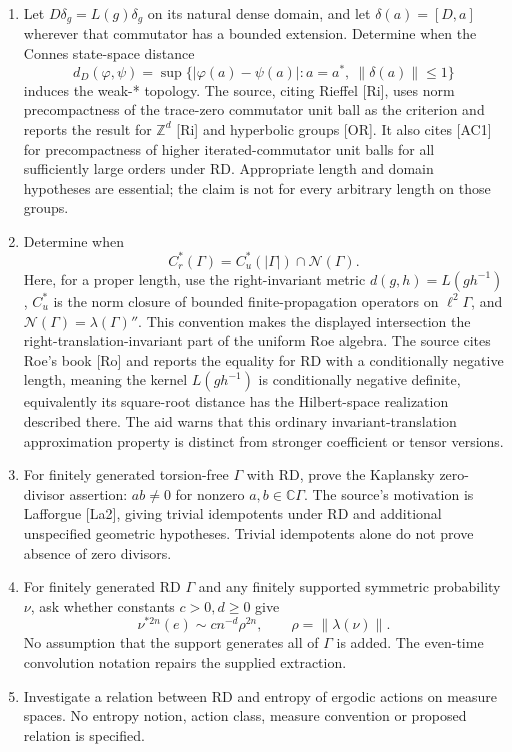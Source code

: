 \documentclass[11pt]{article}
\newcommand{\Z}{\mathbb{Z}}
\newcommand{\C}{\mathbb{C}}
\begin{document}
\begin{enumerate}
\item Let \(D\delta_g=L(g)\delta_g\) on its natural dense domain, and let \(\delta(a)=[D,a]\) wherever that commutator has a bounded extension. Determine when the Connes state-space distance
\[
 d_D(\varphi,\psi)=\sup\{|\varphi(a)-\psi(a)|:a=a^*,\ \|\delta(a)\|\le1\}
\]
induces the weak-* topology. The source, citing Rieffel [Ri], uses norm precompactness of the trace-zero commutator unit ball as the criterion and reports the result for \(\Z^d\) [Ri] and hyperbolic groups [OR]. It also cites [AC1] for precompactness of higher iterated-commutator unit balls for all sufficiently large orders under RD. Appropriate length and domain hypotheses are essential; the claim is not for every arbitrary length on those groups.
\item Determine when
\[
 C_r^*(\Gamma)=C_u^*(|\Gamma|)\cap\mathcal N(\Gamma).
\]
Here, for a proper length, use the right-invariant metric \(d(g,h)=L(gh^{-1})\), \(C_u^*\) is the norm closure of bounded finite-propagation operators on \(\ell^2\Gamma\), and \(\mathcal N(\Gamma)=\lambda(\Gamma)''\). This convention makes the displayed intersection the right-translation-invariant part of the uniform Roe algebra. The source cites Roe's book [Ro] and reports the equality for RD with a conditionally negative length, meaning the kernel \(L(gh^{-1})\) is conditionally negative definite, equivalently its square-root distance has the Hilbert-space realization described there. The aid warns that this ordinary invariant-translation approximation property is distinct from stronger coefficient or tensor versions.
\item For finitely generated torsion-free \(\Gamma\) with RD, prove the Kaplansky zero-divisor assertion: \(ab\ne0\) for nonzero \(a,b\in\C\Gamma\). The source's motivation is Lafforgue [La2], giving trivial idempotents under RD and additional unspecified geometric hypotheses. Trivial idempotents alone do not prove absence of zero divisors.
\item For finitely generated RD \(\Gamma\) and any finitely supported symmetric probability \(\nu\), ask whether constants \(c>0,d\ge0\) give
\[
 \nu^{*2n}(e)\sim c n^{-d}\rho^{2n},\qquad \rho=\|\lambda(\nu)\|.
\]
No assumption that the support generates all of \(\Gamma\) is added. The even-time convolution notation repairs the supplied extraction.
\item Investigate a relation between RD and entropy of ergodic actions on measure spaces. No entropy notion, action class, measure convention or proposed relation is specified.
\end{enumerate}
\end{document}
